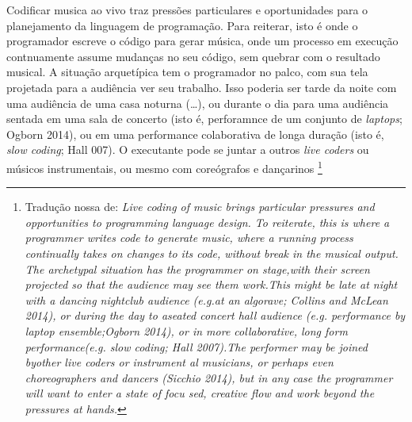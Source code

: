 \begin{citacao}
Codificar musica ao vivo traz pressões particulares e oportunidades para o planejamento da linguagem de programação. Para reiterar, isto é onde o programador escreve o código para gerar música, onde um processo em execução contnuamente  assume mudanças no seu código, sem quebrar com o resultado musical. A situação arquetípica tem o programador no palco, com sua tela projetada para a audiência ver seu trabalho. Isso poderia ser tarde da noite com uma audiência de uma casa noturna (\ldots), ou durante o dia para uma audiência sentada  em uma sala de concerto (isto é, perforamnce de um conjunto de \emph{laptops}; Ogborn 2014), ou em uma performance colaborativa de longa duração (isto é, \emph{slow coding}; Hall 007). O executante pode se juntar a outros \emph{live coders} ou  músicos instrumentais, ou mesmo com coreógrafos e dançarinos \cite[p.~63]{mclean_making_2014} \footnote{Tradução nossa de: \emph{Live coding of music brings particular pressures and opportunities to programming language design. To reiterate, this is where a programmer writes code to generate music, where a running process continually takes on changes to its code, without break in the musical output. The archetypal situation has the programmer on stage,with their screen projected so that the audience may see them work.This might be late at night with a dancing nightclub audience (e.g.at an algorave; Collins and McLean 2014), or during the day to aseated concert hall audience (e.g. performance by laptop ensemble;Ogborn 2014), or in more collaborative, long form performance(e.g. slow coding; Hall 2007).The performer may be joined byother live coders or instrument
al musicians, or perhaps even choreographers and dancers (Sicchio 2014), but in any case the programmer will want to enter a state of focu
sed, creative flow and work beyond the pressures at hands.}}
\end{citacao}






